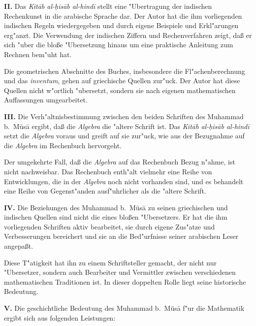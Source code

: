 \documentclass[11pt,a4paper]{article}
\begin{document}
\textbf{II.} Das \textit{Kit\=ab al-\d{h}is\=ab al-hind\=i} stellt eine "Ubertragung der indischen Rechenkunst in die arabische Sprache dar. Der Autor hat die ihm vorliegenden indischen Regeln wiedergegeben und durch eigene Beispiele und Erkl"arungen erg"anzt. Die Verwendung der indischen Ziffern und Rechenverfahren zeigt, da\ss{} er sich "uber die blo\ss{}e "Ubersetzung hinaus um eine praktische Anleitung zum Rechnen bem"uht hat.

Die geometrischen Abschnitte des Buches, insbesondere die Fl"achenberechnung und das \textit{inventum}, gehen auf griechische Quellen zur"uck. Der Autor hat diese Quellen nicht w"ortlich "ubersetzt, sondern sie nach eigenen mathematischen Auffassungen umgearbeitet.

\textbf{III.} Die Verh"altnisbestimmung zwischen den beiden Schriften des Muhammad b.\ M\"us\=a ergibt, da\ss{} die \textit{Algebra} die "altere Schrift ist. Das \textit{Kit\=ab al-\d{h}is\=ab al-hind\=i} setzt die \textit{Algebra} voraus und greift auf sie zur"uck, wie aus der Bezugnahme auf die \textit{Algebra} im Rechenbuch hervorgeht.

Der umgekehrte Fall, da\ss{} die \textit{Algebra} auf das Rechenbuch Bezug n"ahme, ist nicht nachweisbar. Das Rechenbuch enth"alt vielmehr eine Reihe von Entwicklungen, die in der \textit{Algebra} noch nicht vorhanden sind, und es behandelt eine Reihe von Gegenst"anden ausf"uhrlicher als die "altere Schrift.

\textbf{IV.} Die Beziehungen des Muhammad b.\ M\"us\=a zu seinen griechischen und indischen Quellen sind nicht die eines blo\ss{}en "Ubersetzers. Er hat die ihm vorliegenden Schriften aktiv bearbeitet, sie durch eigene Zus"atze und Verbesserungen bereichert und sie an die Bed"urfnisse seiner arabischen Leser angepa\ss{}t.

Diese T"atigkeit hat ihn zu einem Schriftsteller gemacht, der nicht nur "Ubersetzer, sondern auch Bearbeiter und Vermittler zwischen verschiedenen mathematischen Traditionen ist. In dieser doppelten Rolle liegt seine historische Bedeutung.

\textbf{V.} Die geschichtliche Bedeutung des Muhammad b.\ M\"us\=a f"ur die Mathematik ergibt sich aus folgenden Leistungen:
\end{document}
